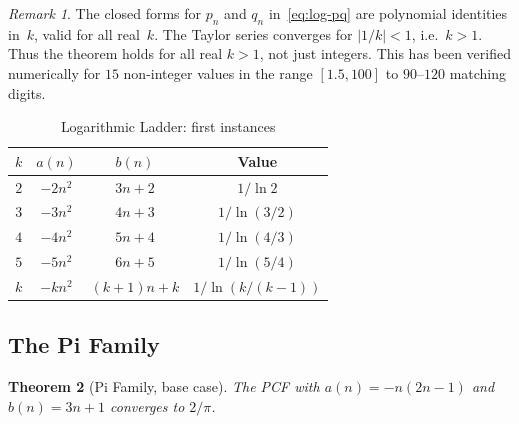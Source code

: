 \documentclass[11pt,a4paper]{article}
\theoremstyle{plain}
\newtheorem{theorem}{Theorem}
\theoremstyle{remark}
\newtheorem{remark}[theorem]{Remark}
\begin{document}
\begin{remark}\label{rem:real-k}
The closed forms for $p_n$ and $q_n$ in~\eqref{eq:log-pq} are
polynomial identities in~$k$, valid for all real~$k$.
The Taylor series converges for $|1/k| < 1$, i.e.\ $k > 1$.
Thus the theorem holds for all real $k > 1$, not just integers.
This has been verified numerically for $15$ non-integer values in
the range $[1.5, 100]$ to $90$--$120$ matching digits.
\end{remark}

\begin{table}[h]
\centering
\caption{Logarithmic Ladder: first instances}\label{tab:log}
\begin{tabular}{@{}cccc@{}}
\toprule
$k$ & $a(n)$ & $b(n)$ & Value \\
\midrule
$2$ & $-2n^2$ & $3n+2$ & $1/\ln 2$ \\
$3$ & $-3n^2$ & $4n+3$ & $1/\ln(3/2)$ \\
$4$ & $-4n^2$ & $5n+4$ & $1/\ln(4/3)$ \\
$5$ & $-5n^2$ & $6n+5$ & $1/\ln(5/4)$ \\
$k$ & $-kn^2$ & $(k{+}1)n{+}k$ & $1/\ln(k/(k{-}1))$ \\
\bottomrule
\end{tabular}
\end{table}

\subsection{The Pi Family}

\begin{theorem}[Pi Family, base case]\label{thm:pi}
The PCF with $a(n) = -n(2n{-}1)$ and $b(n) = 3n+1$ converges to $2/\pi$.
\end{theorem}
\end{document}
